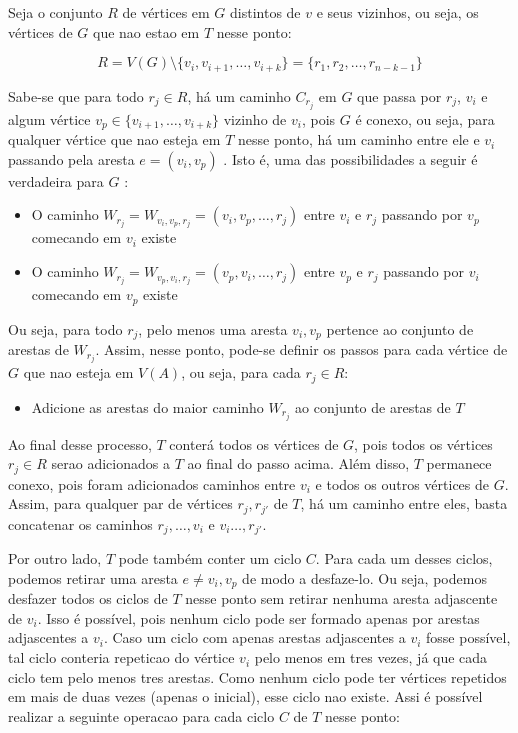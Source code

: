 \documentclass{article}
\begin{document}
Seja o conjunto $R$ de vértices em $G$ distintos de $v$ e seus vizinhos, ou seja, os vértices de $G$ que nao estao em $T$ nesse ponto:


$$
R = V(G) \setminus \{v_i, v_{i+1}, \ldots, v_ {i + k}\} = \{r_1, r_2, \ldots, r_{n - k - 1}\}
$$


Sabe-se que para todo $r_j \in R$, há um caminho $C_{r_j}$ em $G$ que passa por $r_j$, $v_i$ e algum vértice $v_p \in  \{v_{i+1}, \dots, v_{i + k}\}$ vizinho de $v_i$, pois $G$ é conexo, ou seja, para qualquer vértice que nao esteja em $T$ nesse ponto, há um caminho entre ele e $v_i$ passando pela aresta $e = (v_i, v_p)$ . Isto é, uma das possibilidades a seguir é verdadeira para $G$ :

\begin{itemize}
	\item O caminho $ W_{r_j} = W_{v_i, v_p, r_j} = (v_i, v_p, \ldots, r_j) $ entre $v_i$ e $r_j$ passando por $v_p$  comecando em $v_i$ existe
	\item O caminho $W_{r_j} = W_{v_p, v_i, r_j} = (v_p, v_i,  \ldots, r_j) $ entre $v_p$ e $r_j$ passando por $v_i$  comecando em $v_p$ existe
\end{itemize}


Ou seja, para todo $r_j$, pelo menos uma aresta $v_i, v_p$ pertence ao conjunto de arestas de $W_{r_j}$. Assim, nesse ponto, pode-se definir os passos para cada vértice de $G$ que nao esteja em $V(A)$, ou seja, para cada $r_j \in R$:



\begin{itemize}
	\item Adicione as arestas do maior caminho $W_{r_j}$ ao conjunto de arestas de $T$
\end{itemize}


Ao final desse processo, $T$ conterá todos os vértices de $G$, pois todos os vértices $r_j \in R$ serao adicionados a $T$ ao final do passo acima.  Além disso, $T$ permanece conexo, pois foram adicionados caminhos entre $v_i$ e todos os outros vértices de $G$. Assim, para qualquer par de vértices $r_j,r_{j'}$ de $T$, há um caminho entre eles, basta concatenar os caminhos $r_j, \ldots, v_i$ e $v_i \ldots, r_{j'}$.

Por outro lado,  $T$ pode também conter um ciclo $C$. Para cada um desses ciclos, podemos retirar uma aresta $e \neq v_i, v_p$ de modo a desfaze-lo. Ou seja, podemos desfazer todos os ciclos de $T$ nesse ponto sem retirar nenhuma aresta adjascente de $v_i$. Isso é possível, pois nenhum ciclo pode ser formado apenas por arestas adjascentes a $v_i$. Caso um ciclo com apenas arestas adjascentes a $v_i$ fosse possível, tal ciclo conteria repeticao do vértice $v_i$ pelo menos em tres vezes, já que cada ciclo tem pelo menos tres arestas. Como nenhum ciclo pode ter vértices repetidos em mais de duas vezes (apenas o inicial), esse ciclo nao existe.  Assi é possível realizar a seguinte operacao para cada ciclo $C$ de $T$ nesse ponto:
\end{document}
